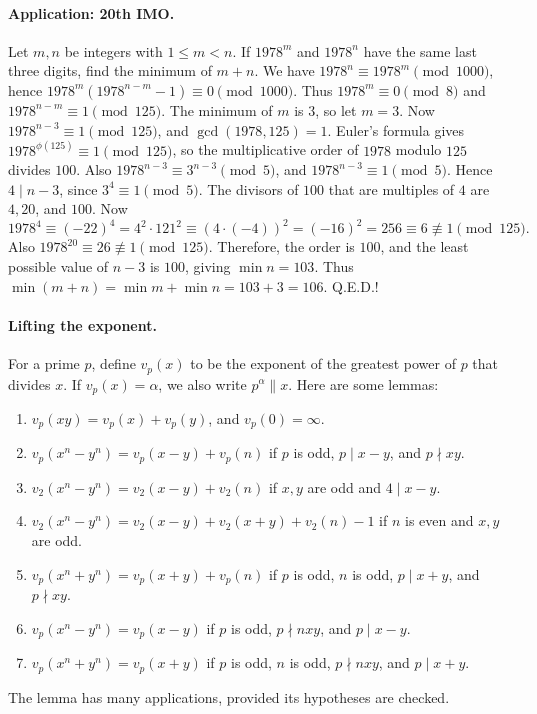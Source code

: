 \documentclass[11pt,a4paper]{article}
\begin{document}
\paragraph{Application: 20th IMO.}
Let $m,n$ be integers with $1\leq m<n$.
If $1978^m$ and $1978^n$ have the same last three digits, find the minimum of $m+n$.
We have $1978^n\equiv1978^m\pmod{1000}$, hence
$1978^m(1978^{n-m}-1)\equiv0\pmod{1000}$.
Thus $1978^m\equiv0\pmod8$ and $1978^{n-m}\equiv1\pmod{125}$.
The minimum of $m$ is $3$, so let $m=3$.
Now $1978^{n-3}\equiv1\pmod{125}$, and $\gcd(1978,125)=1$.
Euler's formula gives $1978^{\phi(125)}\equiv1\pmod{125}$, so the multiplicative order of $1978$ modulo $125$ divides $100$.
Also $1978^{n-3}\equiv3^{n-3}\pmod5$, and $1978^{n-3}\equiv1\pmod5$.
Hence $4\mid n-3$, since $3^4\equiv1\pmod5$.
The divisors of $100$ that are multiples of $4$ are $4,20$, and $100$.
Now
\[1978^4\equiv(-22)^4=4^2\cdot121^2\equiv(4\cdot(-4))^2
=(-16)^2=256\equiv6\not\equiv1\pmod{125}.\]
Also $1978^{20}\equiv26\not\equiv1\pmod{125}$.
Therefore, the order is $100$, and the least possible value of $n-3$ is $100$, giving $\min n=103$.
Thus $\min(m+n)=\min m+\min n=103+3=106$.
Q.E.D.!
\paragraph{Lifting the exponent.}\leavevmode\par
\setcounter{theorem}{93}\begin{lemma}\label{lemma:lb1-96}
For a prime $p$, define $v_p(x)$ to be the exponent of the greatest power of $p$ that divides $x$.
If $v_p(x)=\alpha$, we also write $p^\alpha\mathbin{\|}x$.
Here are some lemmas:
\begin{enumerate}
\setcounter{enumi}{0}\item $v_p(xy)=v_p(x)+v_p(y)$, and $v_p(0)=\infty$.
\setcounter{enumi}{1}\item $v_p(x^n-y^n)=v_p(x-y)+v_p(n)$ if $p$ is odd, $p\mid x-y$, and $p\nmid xy$.
\setcounter{enumi}{2}\item $v_2(x^n-y^n)=v_2(x-y)+v_2(n)$ if $x,y$ are odd and $4\mid x-y$.
\setcounter{enumi}{3}\item $v_2(x^n-y^n)=v_2(x-y)+v_2(x+y)+v_2(n)-1$ if $n$ is even and $x,y$ are odd.
\setcounter{enumi}{4}\item $v_p(x^n+y^n)=v_p(x+y)+v_p(n)$ if $p$ is odd, $n$ is odd, $p\mid x+y$, and $p\nmid xy$.
\setcounter{enumi}{5}\item $v_p(x^n-y^n)=v_p(x-y)$ if $p$ is odd, $p\nmid nxy$, and $p\mid x-y$.
\setcounter{enumi}{6}\item $v_p(x^n+y^n)=v_p(x+y)$ if $p$ is odd, $n$ is odd, $p\nmid nxy$, and $p\mid x+y$.
\end{enumerate}
\end{lemma}
The lemma has many applications, provided its hypotheses are checked.
\end{document}
